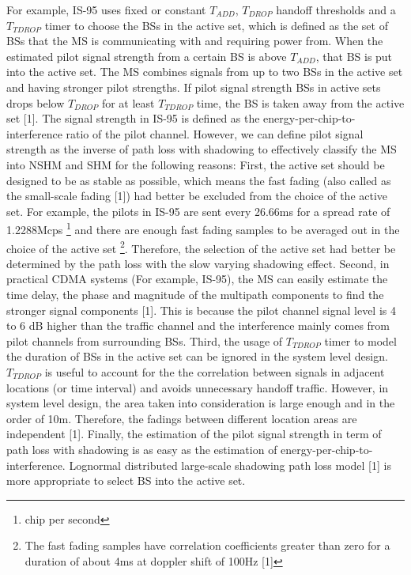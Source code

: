 For example, IS-95 uses fixed or constant $T_{ADD}$, $T_{DROP}$
handoff thresholds and a $T_{TDROP}$ timer to choose the BSs in
the active set, which is defined as the set of BSs that the MS is
communicating with and requiring power from. When the estimated
pilot signal strength from a certain BS is above $T_{ADD}$, that
BS is put into the active set. The MS combines signals from up to
two BSs in the active set and having stronger pilot strengths. If
pilot signal strength BSs in active sets drops below $T_{DROP}$
for at least $T_{TDROP}$ time, the BS is taken away from the
active set [1]. The signal strength in IS-95 is defined as the
energy-per-chip-to-interference ratio of the pilot channel.
However, we can define pilot signal strength as the inverse of
path loss with shadowing to effectively classify the MS into NSHM
and SHM for the following reasons: First, the active set should be
designed to be as stable as possible, which means the fast fading
(also called as the small-scale fading [1]) had better be excluded
from the choice of the active set. For example, the pilots in
IS-95 are sent every 26.66ms for a spread rate of 1.2288Mcps
\footnote{chip per second} and there are enough fast fading
samples to be averaged out in the choice of the active set
\footnote{The fast fading samples have correlation coefficients
greater than zero for a duration of about 4ms at doppler shift of
100Hz [1]}. Therefore, the selection of the active set had better
be determined by the path loss with the slow varying shadowing
effect. Second, in practical CDMA systems (For example, IS-95),
the MS can easily estimate the time delay, the phase and magnitude
of the multipath components to find the stronger signal components
[1]. This is because the pilot channel signal level is 4 to 6 dB
higher than the traffic channel and the interference mainly comes
from pilot channels from surrounding BSs. Third, the usage of
$T_{TDROP}$ timer to model the duration of BSs in the active set
can be ignored in the system level design. $T_{TDROP}$ is useful
to account for the the correlation between signals in adjacent
locations (or time interval) and avoids unnecessary handoff
traffic. However, in system level design, the area taken into
consideration is large enough and in the order of 10m. Therefore,
the fadings between different location areas are independent [1].
Finally, the estimation of the pilot signal strength in term of
path loss with shadowing is as easy as the estimation of
energy-per-chip-to-interference. Lognormal distributed large-scale
shadowing path loss model [1] is more appropriate to select BS
into the active set.

